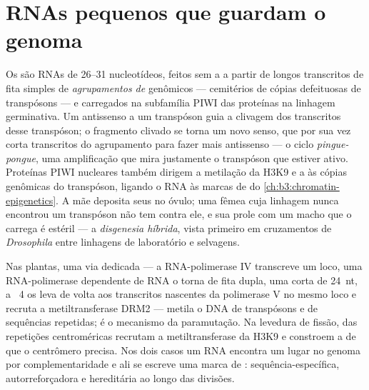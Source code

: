 \section{RNAs pequenos que guardam o genoma}

\begin{definition}\label{def:b3:rna-regulation:pirna}
Os \emph{} são RNAs de \numrange{26}{31} nucleotídeos, feitos sem
a  a partir de longos transcritos de fita simples de
\emph{agrupamentos de } genômicos --- cemitérios de cópias
defeituosas de transpósons --- e carregados na subfamília PIWI das
proteínas  na linhagem germinativa. Um  antissenso a um
transpóson guia a clivagem dos transcritos desse transpóson; o
fragmento clivado se torna um novo  senso, que por sua vez corta
transcritos do agrupamento para fazer mais  antissenso --- o
ciclo \emph{pingue-pongue}, uma amplificação que mira justamente o
transpóson que estiver ativo. Proteínas PIWI nucleares também dirigem
a metilação da H3K9 e a  às cópias genômicas do
transpóson, ligando o RNA às marcas de  do
\cref{ch:b3:chromatin-epigenetics}. A mãe deposita seus  no
óvulo; uma fêmea cuja linhagem nunca encontrou um transpóson não tem
 contra ele, e sua prole com um macho que o carrega é estéril
--- a \emph{disgenesia híbrida}, vista primeiro em cruzamentos de
\emph{Drosophila} entre linhagens de laboratório e selvagens.
\end{definition}

\begin{proposition}\label{prop:b3:rna-regulation:rddm}
Nas plantas, uma via dedicada --- a RNA-polimerase IV transcreve um
loco, uma RNA-polimerase dependente de RNA o torna de fita dupla, uma
 corta  de \qty{24}{nt}, a ~4 os leva de volta aos
transcritos nascentes da polimerase V no mesmo loco e recruta a
metiltransferase DRM2 --- metila o DNA de transpósons e de sequências
repetidas; é o mecanismo da paramutação. Na levedura de fissão,
 das repetições centroméricas recrutam a metiltransferase da
H3K9 e constroem a  de que o centrômero precisa. Nos
dois casos um RNA encontra um lugar no genoma por complementaridade e
ali se escreve uma marca de : sequência-específica,
autorreforçadora e hereditária ao longo das divisões.
\end{proposition}

